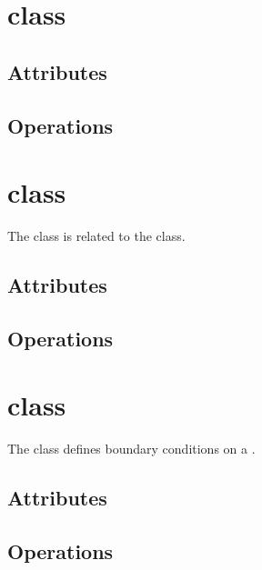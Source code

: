 \section{ class}


\subsection{Attributes}

\subsection{Operations}

\section{ class}

The  class is related to the  class.


\subsection{Attributes}

\subsection{Operations}

\section{ class}

The  class defines boundary conditions on a .



\subsection{Attributes}

\subsection{Operations}

